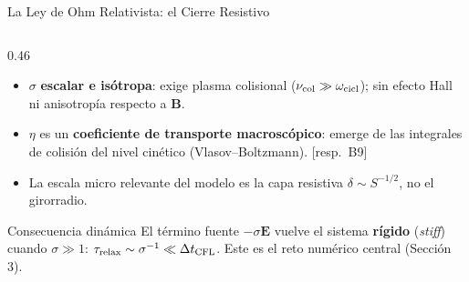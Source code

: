 \documentclass[aspectratio=169,9pt]{beamer}
\begin{document}
\begin{frame}{La Ley de Ohm Relativista: el Cierre Resistivo}
\begin{columns}[T]
\begin{column}{0.46\textwidth}
\begin{tcolorbox}[WRN={El cierre y sus l\'imites de validez}]
    \scriptsize
    \begin{itemize}\setlength\itemsep{2pt}
      \item $\sigma$ \textbf{escalar e is\'otropa}: exige plasma colisional
            ($\nu_{\rm col}\gg\omega_{\rm cicl}$); sin efecto Hall ni
            anisotrop\'ia respecto a $\mathbf B$.
      \item $\eta$ es un \textbf{coeficiente de transporte macrosc\'opico}:
            emerge de las integrales de colisi\'on del nivel cin\'etico
            (Vlasov--Boltzmann). \hfill{\tiny[resp.\ B9]}
      \item La escala micro relevante del modelo es la capa resistiva
            $\delta\sim S^{-1/2}$, no el girorradio.
    \end{itemize}
  \end{tcolorbox}
  \pause\vspace{0.1cm}
  \begin{block}{Consecuencia din\'amica}
    \scriptsize
    El t\'ermino fuente $-\sigma\mathbf E$ vuelve el sistema
    \textbf{r\'igido} (\textit{stiff}) cuando $\sigma\gg1$:
    $\tau_{\rm relax}\sim\sigma^{-1}\ll\Delta t_{\rm CFL}$.
    Este es el reto num\'erico central (Secci\'on 3).
  \end{block}
\end{column}
\end{columns}
\end{frame}
\end{document}
